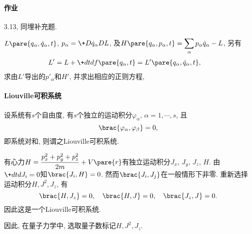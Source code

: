 \documentclass{ctexart}
\begin{document}
\paragraph{作业} %
\label{par:作业}

3.13, 同埋补充题.
\begin{ex}
    $L\pare{q_\alpha,\dot{q}_\alpha,t}$, $\displaystyle p_\alpha = \+D{\dot{q}_\alpha}DL$, 及$H\pare{q_\alpha,p_\alpha,t} = \displaystyle \sum_{\alpha}p_\alpha \dot{q}_\alpha - L$, 另有
    \begin{align*}
        L' &= L + \+dtd{} f\pare{q_\alpha,t}  = L'\pare{q_\alpha,\dot{q}_\alpha,t},
    \end{align*}
    求由$L'$导出的$p'_\alpha$和$H'$, 并求出相应的正则方程,
\end{ex}


\paragraph{Liouville可积系统} %
\label{par:liouville可积系统}

设系统有$s$个自由度, 有$s$个独立的运动积分$\varphi_\alpha$, $\alpha=1,\cdots,s$, 且
\[ \brac{\varphi_\alpha,\varphi_\beta} = 0, \]
即系统对和, 则谓之Liouville可积系统.
\begin{ex}
    有心力$\displaystyle H = \frac{p_x^2 + p_y^2 + p_z^2}{2m} + V\pare{r}$有独立运动积分$J_x$, $J_y$, $J_z$, $H$. 由$\displaystyle \+dtd{J_i} = 0$知$\brac{J_i,H} = 0$. 然而$\brac{J_i,J_j}$在一般情形下非零. 重新选择运动积分$H, J^2, J_z$, 有
    \[ \brac{H,J_z} = 0,\quad \brac{H,J} = 0, \quad \brac{J_z,J} = 0. \]
    因此这是一个Liouville可积系统.
\end{ex}
\begin{remark}
    因此, 在量子力学中, 选取量子数标记$H, J^2, J_z$.
\end{remark}

\end{document}
